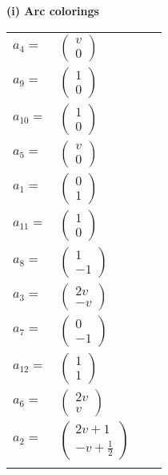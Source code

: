 \documentclass[1p]{elsarticle_modified}
\theoremstyle{definition}
\begin{document}
\flushleft \textbf{(i) Arc colorings}\\
\begin{tabular}{m{7pt} m{180pt} m{7pt} m{180pt} }
\flushright $a_{4}=$&$\begin{pmatrix}v\\0\end{pmatrix}$ \\
\flushright $a_{9}=$&$\begin{pmatrix}1\\0\end{pmatrix}$ \\
\flushright $a_{10}=$&$\begin{pmatrix}1\\0\end{pmatrix}$ \\
\flushright $a_{5}=$&$\begin{pmatrix}v\\0\end{pmatrix}$ \\
\flushright $a_{1}=$&$\begin{pmatrix}0\\1\end{pmatrix}$ \\
\flushright $a_{11}=$&$\begin{pmatrix}1\\0\end{pmatrix}$ \\
\flushright $a_{8}=$&$\begin{pmatrix}1\\-1\end{pmatrix}$ \\
\flushright $a_{3}=$&$\begin{pmatrix}2 v\\- v\end{pmatrix}$ \\
\flushright $a_{7}=$&$\begin{pmatrix}0\\-1\end{pmatrix}$ \\
\flushright $a_{12}=$&$\begin{pmatrix}1\\1\end{pmatrix}$ \\
\flushright $a_{6}=$&$\begin{pmatrix}2 v\\v\end{pmatrix}$ \\
\flushright $a_{2}=$&$\begin{pmatrix}2 v+1\\- v+\frac{1}{2}\end{pmatrix}$\\&\end{tabular}
\end{document}
